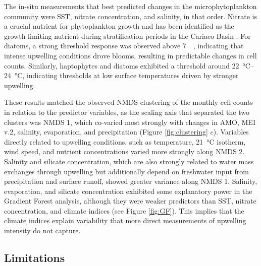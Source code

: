 \documentclass[draft]{agujournal2019}
\begin{document}
    The in-situ measurements that best predicted changes in the microphytoplankton community were SST, nitrate concentration, and salinity, in that order. Nitrate is a crucial nutrient for phytoplankton growth and has been identified as the growth-limiting nutrient during stratification periods in the Cariaco Basin \cite{muller-karger_scientific_2019}. For diatoms, a strong threshold response was observed above \qty{7}{\micro \molar}, indicating that intense upwelling conditions drove blooms, resulting in predictable changes in cell counts. Similarly, haptophytes and diatoms exhibited a threshold around \qtyrange{22}{24}{\celsius}, indicating thresholds at low surface temperatures driven by stronger upwelling.
    
    These results matched the observed NMDS clustering of the monthly cell counts in relation to the predictor variables, as the scaling axis that separated the two clusters was NMDS 1, which co-varied most strongly with changes in AMO, MEI v.2, salinity, evaporation, and precipitation (Figure \ref{fig:clustering} $c$). Variables directly related to upwelling conditions, such as temperature, \qty{21}{\celsius} isotherm, wind speed, and nutrient concentrations varied more strongly along NMDS 2. Salinity and silicate concentration, which are also strongly related to water mass exchanges through upwelling but additionally depend on freshwater input from precipitation and surface runoff, showed greater variance along NMDS 1. Salinity, evaporation, and silicate concentration exhibited some explanatory power in the Gradient Forest analysis, although they were weaker predictors than SST, nitrate concentration, and climate indices (see Figure \ref{fig:GF}). This implies that the climate indices explain variability that more direct measurements of upwelling intensity do not capture. 
    

\subsection{Limitations}
    
\end{document}
